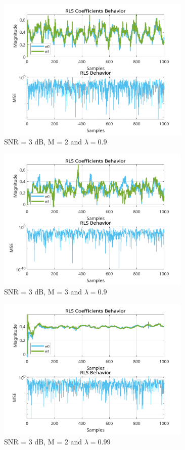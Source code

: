 \documentclass[a4paper,10pt]{article}
\begin{document}
\begin{enumerate}
				\newpage
				\begin{figure}[H]
					\centering
					\includegraphics[width=0.825\textwidth]{figs/L4Q3_rls_mse_2_3_9.png}
					\caption{SNR = 3 dB, M = 2 and $\lambda = 0.9$}
					\label{fig:L4Q3_a1}
				\end{figure}

				\begin{figure}[H]
					\centering
					\includegraphics[width=0.825\textwidth]{figs/L4Q3_rls_mse_3_3_9.png}
					\caption{SNR = 3 dB, M = 3 and $\lambda = 0.9$}
					\label{fig:L4Q3_a2}
				\end{figure}

				\begin{figure}[H]
					\centering
					\includegraphics[width=0.825\textwidth]{figs/L4Q3_rls_mse_2_3_99.png}
					\caption{SNR = 3 dB, M = 2 and $\lambda = 0.99$}
					\label{fig:L4Q3_a3}
				\end{figure}


\end{enumerate}
\end{document}
